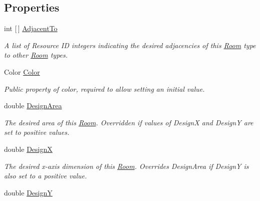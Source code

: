 \subsection*{Properties}
\begin{DoxyCompactItemize}
\item 
int \mbox{[}$\,$\mbox{]} \mbox{\hyperlink{class_room_kit_1_1_room_a9a0ed1a4011c3759f5e39a97d4e7e986}{Adjacent\+To}}
\begin{DoxyCompactList}\small\item\em A list of Resource ID integers indicating the desired adjacencies of this \mbox{\hyperlink{class_room_kit_1_1_room}{Room}} type to other \mbox{\hyperlink{class_room_kit_1_1_room}{Room}} types. \end{DoxyCompactList}\item 
Color \mbox{\hyperlink{class_room_kit_1_1_room_ab988d7b6d772b68911acacc8da422052}{Color}}
\begin{DoxyCompactList}\small\item\em Public property of color, required to allow setting an initial value. \end{DoxyCompactList}\item 
double \mbox{\hyperlink{class_room_kit_1_1_room_ac80adf0821785646dbf908dbcbbb29c8}{Design\+Area}}
\begin{DoxyCompactList}\small\item\em The desired area of this \mbox{\hyperlink{class_room_kit_1_1_room}{Room}}. Overridden if values of DesignX and DesignY are set to positive values. \end{DoxyCompactList}\item 
double \mbox{\hyperlink{class_room_kit_1_1_room_a06bea9a7fbe4558b681f9a047ac03f57}{DesignX}}
\begin{DoxyCompactList}\small\item\em The desired x-\/axis dimension of this \mbox{\hyperlink{class_room_kit_1_1_room}{Room}}. Overrides Design\+Area if DesignY is also set to a positive value. \end{DoxyCompactList}\item 
double \mbox{\hyperlink{class_room_kit_1_1_room_a7d78915f3033469333b61f59dded4ecd}{DesignY}}

\end{DoxyCompactItemize}
